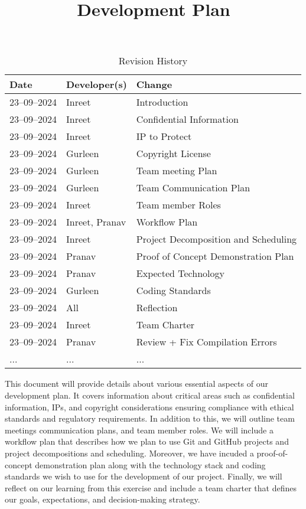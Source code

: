 \documentclass{article}
\title{Development Plan\\\progname}
\author{\authname}
\date{}
\begin{document}
\maketitle

\begin{table}[hp]
\caption{Revision History} \label{TblRevisionHistory}
\begin{tabularx}{\textwidth}{llX}
\toprule
\textbf{Date} & \textbf{Developer(s)} & \textbf{Change}\\
\midrule
23--09--2024 & Inreet & Introduction\\
23--09--2024 & Inreet & Confidential Information\\
23--09--2024 & Inreet & IP to Protect\\
23--09--2024 & Gurleen & Copyright License\\
23--09--2024 & Gurleen & Team meeting Plan\\
23--09--2024 & Gurleen & Team Communication Plan\\
23--09--2024 & Inreet & Team member Roles\\
23--09--2024 & Inreet, Pranav & Workflow Plan\\
23--09--2024 & Inreet & Project Decomposition and Scheduling\\
23--09--2024 & Pranav & Proof of Concept Demonstration Plan\\
23--09--2024 & Pranav & Expected Technology\\
23--09--2024 & Gurleen & Coding Standards\\
23--09--2024 & All & Reflection\\
23--09--2024 & Inreet & Team Charter\\
23--09--2024 & Pranav & Review + Fix Compilation Errors\\
... & ... & ...\\
\bottomrule
\end{tabularx}
\end{table}

\newpage{}

This document will provide details about various essential aspects of our development plan. It covers information about critical areas such as confidential information, IPs, and copyright considerations ensuring compliance with ethical standards and regulatory requirements. In addition to this, we will outline team meetings communication plans, and team member roles. We will include a workflow plan that describes how we plan to use Git and GitHub projects and project decompositions and scheduling. Moreover, we have incuded a proof-of-concept demonstration plan along with the technology stack and coding standards we wish to use for the development of our project. Finally, we will reflect on our learning from this exercise and include a team charter that defines our goals, expectations, and decision-making strategy. 
\end{document}
